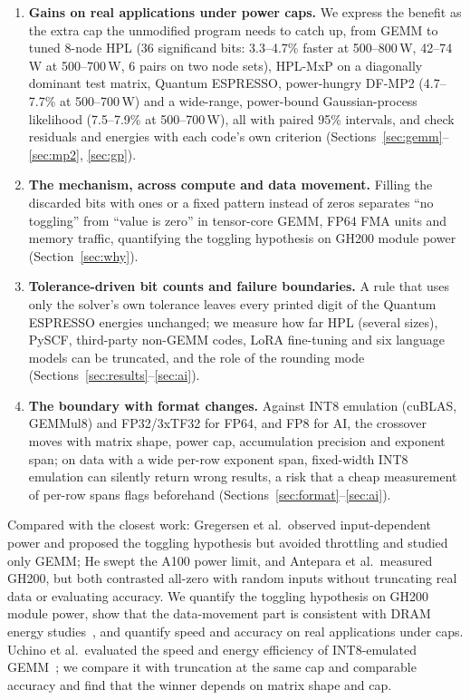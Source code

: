\documentclass[conference]{IEEEtran}
\newcommand{\W}{\,W}
\newcommand{\pct}{\%}
\begin{document}
\begin{enumerate}
\item \textbf{Gains on real applications under power caps.} We express the benefit as the extra cap the unmodified
program needs to catch up, from GEMM to tuned 8-node HPL (36 significand bits: 3.3--4.7\pct{} faster at 500--800\W,
42--74\W{} at 500--700\W, 6 pairs on two node sets), HPL-MxP on a diagonally dominant test matrix, Quantum ESPRESSO,
power-hungry DF-MP2 (4.7--7.7\pct{} at 500--700\W) and a wide-range, power-bound Gaussian-process likelihood
(7.5--7.9\pct{} at 500--700\W), all with paired 95\pct{} intervals, and check residuals and energies with each code's own
criterion
(Sections~\ref{sec:gemm}--\ref{sec:mp2}, \ref{sec:gp}).
\item \textbf{The mechanism, across compute and data movement.} Filling the discarded bits with ones or a fixed
pattern instead of zeros separates ``no toggling'' from ``value is zero'' in tensor-core GEMM, FP64 FMA units and
memory traffic, quantifying the toggling hypothesis on GH200 module power (Section~\ref{sec:why}).
\item \textbf{Tolerance-driven bit counts and failure boundaries.} A rule that uses only the solver's own tolerance
leaves every printed digit of the Quantum ESPRESSO energies unchanged; we measure how far HPL (several sizes),
PySCF, third-party non-GEMM codes, LoRA fine-tuning and six language models can be truncated, and the role of the
rounding mode (Sections~\ref{sec:results}--\ref{sec:ai}).
\item \textbf{The boundary with format changes.} Against INT8 emulation (cuBLAS, GEMMul8) and FP32/3xTF32 for FP64,
and FP8 for AI, the crossover moves with matrix shape, power cap, accumulation precision and exponent span; on
data with a wide per-row exponent span, fixed-width INT8 emulation can silently return wrong results, a risk that a
cheap measurement of per-row spans flags beforehand (Sections~\ref{sec:format}--\ref{sec:ai}).
\end{enumerate}

Compared with the closest work: Gregersen et al.\ observed input-dependent power and proposed the toggling
hypothesis but avoided throttling and studied only GEMM; He swept the A100 power limit, and Antepara et al.\
measured GH200, but both contrasted all-zero with random inputs without truncating real data or evaluating
accuracy. We quantify the toggling hypothesis on GH200 module power, show that the data-movement part is consistent
with DRAM energy studies~\cite{Chatterjee2017,Ghose2018}, and quantify speed and accuracy on real applications under
caps. Uchino et al.\ evaluated the speed and energy efficiency of INT8-emulated GEMM~\cite{Uchino2025}; we compare it
with truncation at the same cap and comparable accuracy and find that the winner depends on matrix shape and cap.
\end{document}
